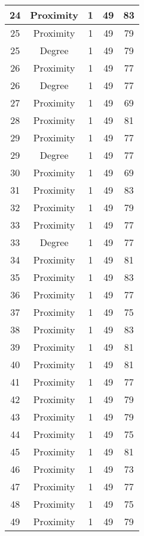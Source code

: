 \documentclass[results.tex]{subfiles}
\begin{document}
\begin{center}
\begin{tabular}{| c || c | c | c | c |}
    \hline
    24 & Proximity & 1 & 49 & 83 \\ 
    \hline
    25 & Proximity & 1 & 49 & 79 \\ 
    \hline
    25 & Degree & 1 & 49 & 79 \\ 
    \hline
    26 & Proximity & 1 & 49 & 77 \\ 
    \hline
    26 & Degree & 1 & 49 & 77 \\ 
    \hline
    27 & Proximity & 1 & 49 & 69 \\ 
    \hline
    28 & Proximity & 1 & 49 & 81 \\ 
    \hline
    29 & Proximity & 1 & 49 & 77 \\ 
    \hline
    29 & Degree & 1 & 49 & 77 \\ 
    \hline
    30 & Proximity & 1 & 49 & 69 \\ 
    \hline
    31 & Proximity & 1 & 49 & 83 \\ 
    \hline
    32 & Proximity & 1 & 49 & 79 \\ 
    \hline
    33 & Proximity & 1 & 49 & 77 \\ 
    \hline
    33 & Degree & 1 & 49 & 77 \\ 
    \hline
    34 & Proximity & 1 & 49 & 81 \\ 
    \hline
    35 & Proximity & 1 & 49 & 83 \\ 
    \hline
    36 & Proximity & 1 & 49 & 77 \\ 
    \hline
    37 & Proximity & 1 & 49 & 75 \\ 
    \hline
    38 & Proximity & 1 & 49 & 83 \\ 
    \hline
    39 & Proximity & 1 & 49 & 81 \\ 
    \hline
    40 & Proximity & 1 & 49 & 81 \\ 
    \hline
    41 & Proximity & 1 & 49 & 77 \\ 
    \hline
    42 & Proximity & 1 & 49 & 79 \\ 
    \hline
    43 & Proximity & 1 & 49 & 79 \\ 
    \hline
    44 & Proximity & 1 & 49 & 75 \\ 
    \hline
    45 & Proximity & 1 & 49 & 81 \\ 
    \hline
    46 & Proximity & 1 & 49 & 73 \\ 
    \hline
    47 & Proximity & 1 & 49 & 77 \\ 
    \hline
    48 & Proximity & 1 & 49 & 75 \\ 
    \hline
    49 & Proximity & 1 & 49 & 79 \\ 
    \hline   \end{tabular}
\end{center}
\end{document}
